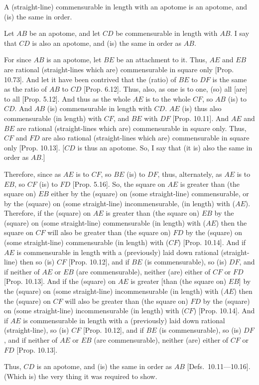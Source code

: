 \begin{Parallel}{}{}
{A (straight-line) commensurable in length
with an apotome is an apotome, and  (is) the same in order.

\epsfysize=0.7in
\centerline{}

Let $AB$ be an apotome, and let $CD$ be commensurable in length with $AB$. I say that $CD$ is also an apotome, and (is) the same in order as $AB$.

For since $AB$ is an apotome, let $BE$ be an attachment to it. Thus,
$AE$ and $EB$ are rational (straight-lines which are) commensurable in
square only [Prop. 10.73]. And let it have
been contrived that the (ratio)
of $BE$ to $DF$ is the same as the ratio of $AB$ to $CD$
[Prop. 6.12]. Thus, also, as one is to one, (so)
all [are] to all [Prop. 5.12]. And thus as the whole $AE$ is to the whole $CF$, so $AB$
(is) to $CD$. And $AB$ (is) commensurable in length with $CD$.
$AE$ (is) thus also commensurable (in length) with $CF$, and $BE$
with $DF$ [Prop. 10.11]. And $AE$ and $BE$
are rational (straight-lines which are) commensurable in square only.
Thus, $CF$ and $FD$ are also rational (straight-lines which are) commensurable in square only [Prop. 10.13].
[$CD$ is thus an apotome. So, I say that (it is) also the same in order as $AB$.]

Therefore, since as $AE$ is to $CF$, so $BE$ (is) to $DF$, thus, alternately,
as $AE$ is to $EB$, so $CF$ (is) to $FD$ [Prop. 5.16]. So,  the square on $AE$
is greater than (the square on) $EB$ either by the (square) on (some straight-line)
commensurable,  or by the (square) on (some straight-line)
incommensurable, (in length) with ($AE$). Therefore, if the
(square) on $AE$ is greater than (the square on) $EB$ by the (square)
on (some straight-line) commensurable (in length) with ($AE$) then the
square on $CF$ will also be greater than (the square on) $FD$ by the (square)
on (some straight-line) commensurable (in length) with ($CF$)
[Prop. 10.14]. And if $AE$ is commensurable
in length with a (previously) laid down rational (straight-line) then so (is)
$CF$ [Prop. 10.12], and if $BE$ (is commensurable), so (is) $DF$, and if neither of
$AE$ or $EB$ (are commensurable), neither  (are) either of $CF$ or $FD$
[Prop. 10.13]. And if the (square) on
$AE$ is greater [than (the square on) $EB$] by the (square) on
(some straight-line) incommensurable (in length) with ($AE$) then the
(square) on $CF$ will also be greater than (the square on) $FD$ by the (square)
on (some straight-line) incommensurable (in length) with ($CF$)
[Prop. 10.14].  And if $AE$ is commensurable
in length with a (previously) laid down rational (straight-line), so (is)
$CF$ [Prop. 10.12], and if $BE$ (is commensurable), so (is) $DF$, and if neither of
$AE$ or $EB$ (are commensurable),  neither (are)  either of $CF$ or $FD$
[Prop. 10.13].

Thus, $CD$ is an apotome, and (is) the same in order as $AB$ [Defs.~10.11---10.16].
(Which is) the very thing it was required to show.}
\end{Parallel}

